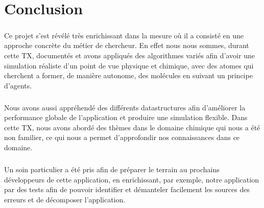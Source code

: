 \chapter*{Conclusion}


\paragraph{}
Ce projet s’est révélé très enrichissant dans la mesure où il a consisté en une
approche concrète du métier de chercheur. En effet nous nous sommes, durant
cette TX, documentés et avons appliqués des algorithmes variés afin d'avoir une
simulation réaliste d'un point de vue physique et chimique, avec des atomes qui
cherchent a former, de manière autonome, des molécules en suivant un principe
d'agents.

\paragraph{}
Nous avons aussi appréhendé des différents datastructures afin d'améliorer la
performance globale de l'application et produire une simulation flexible. Dans
cette TX, nous avons abordé des thèmes dans le domaine chimique qui nous a été
non familier, ce qui nous a permet d'approfondir nos connaissances dans ce
domaine.

\paragraph{}
Un soin particulier a été pris afin de préparer le terrain au prochains
développeurs de cette application, en enrichissant, par exemple, notre
application par des tests afin de pouvoir identifier et démanteler facilement
les sources des erreurs et de décomposer l'application.
